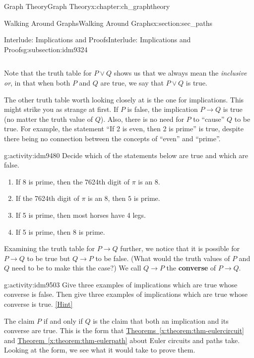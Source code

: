 \documentclass[oneside,10pt,]{book}
\newcommand{\terminology}[1]{\textbf{#1}}
\numberwithin{equation}{chapter}
\def\imp{\rightarrow}
\begin{document}
\begin{chapterptx}{Graph Theory}{}{Graph Theory}{}{}{x:chapter:ch_graphtheory}
\begin{sectionptx}{Walking Around Graphs}{}{Walking Around Graphs}{}{}{x:section:sec_paths}
\begin{subsectionptx}{Interlude: Implications and Proofs}{}{Interlude: Implications and Proofs}{}{}{g:subsection:idm9324}
\begin{sidebyside}{4}{0.025}{0.025}{0.05}
\begin{sbspanel}{0.2}
{\begin{tabular}{cBc}
\end{tabular}
\par}
\end{sbspanel}%
\end{sidebyside}%
\par
Note that the truth table for \(P \vee Q\) shows us that we always mean the \emph{inclusive or}, in that when both \(P\) and \(Q\) are true, we say that \(P \vee Q\) is true.%
\par
The other truth table worth looking closely at is the one for implications.  This might strike you as strange at first.  If \(P\) is false, the implication \(P \imp Q\) is true (no matter the truth value of \(Q\)).  Also, there is no need for \(P\) to ``cause'' \(Q\) to be true.  For example, the statement ``If 2 is even, then 2 is prime'' is true, despite there being no connection between the concepts of ``even'' and ``prime''.%
\begin{activity}{}{g:activity:idm9480}%
Decide which of the statements below are true and which are false.%
\begin{enumerate}[font=\bfseries,label=(\alph*),ref=\alph*]
\item{}If 8 is prime, then the 7624th digit of \(\pi\) is an 8.%
\item{}If the 7624th digit of \(\pi\) is an 8, then \(5\) is prime.%
\item{}If 5 is prime, then most horses have 4 legs.%
\item{}If 5 is prime, then 8 is prime.%
\end{enumerate}
\end{activity}
Examining the truth table for \(P \imp Q\) further, we notice that it is possible for \(P \imp Q\) to be true but \(Q \imp P\) to be false. (What would the truth values of \(P\) and \(Q\) need to be to make this the case?) We call \(Q \imp P\) the \terminology{converse} of \(P \imp Q\).%
\begin{activity}{}{g:activity:idm9503}%
Give three examples of implications which are true whose converse is false.  Then give three examples of implications which are true whose converse is true.%
\space\hspace*{0pt}\hfill{\tiny\hyperlink{g:hint:idm9506-back}{[Hint]}}\end{activity}
The claim \(P\) if and only if \(Q\) is the claim that both an implication and its converse are true.  This is the form that \hyperref[x:theorem:thm-eulercircuit]{Theorems~\ref{x:theorem:thm-eulercircuit}} and \hyperref[x:theorem:thm-eulerpath]{Theorem~\ref{x:theorem:thm-eulerpath}} about Euler circuits and paths take.  Looking at the form, we see what it would take to prove them.%

\end{subsectionptx}
\end{sectionptx}
\end{chapterptx}
\end{document}
